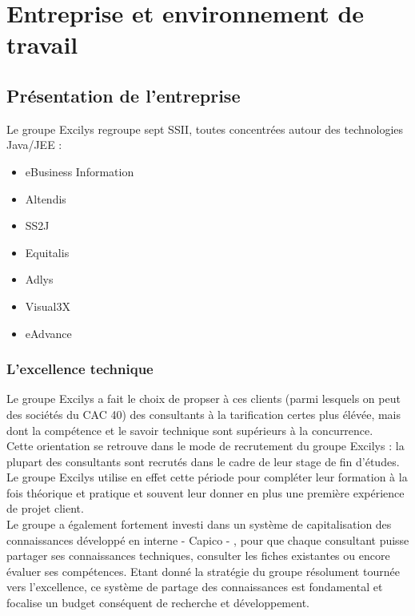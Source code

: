 \section{Entreprise et environnement de travail}

\subsection{Présentation de l'entreprise}

Le groupe Excilys regroupe sept SSII, toutes concentrées autour des technologies Java/JEE : 
\begin{itemize}
	\item eBusiness Information
	\item Altendis
	\item SS2J
	\item Equitalis
	\item Adlys
	\item Visual3X
	\item eAdvance
\end{itemize}

\subsubsection{L'excellence technique}
Le groupe Excilys a fait le choix de propser à ces clients (parmi lesquels on peut des sociétés du CAC 40) des consultants à la tarification certes plus élévée, mais dont la compétence et le savoir technique sont supérieurs à la concurrence.\\

Cette orientation se retrouve dans le mode de recrutement du groupe Excilys : la plupart des consultants sont recrutés dans le cadre de leur stage de fin d'études.\\
Le groupe Excilys utilise en effet cette période pour compléter leur formation à la fois théorique et pratique et souvent leur donner en plus une première expérience de projet client.\\

Le groupe a également fortement investi dans un système de capitalisation des
connaissances développé en interne - Capico - , pour que chaque consultant puisse partager ses connaissances techniques, consulter les fiches existantes ou encore évaluer ses compétences. Etant donné la stratégie du groupe résolument tournée vers l’excellence, ce système de partage des connaissances est fondamental et focalise un budget conséquent de recherche et développement.\\

